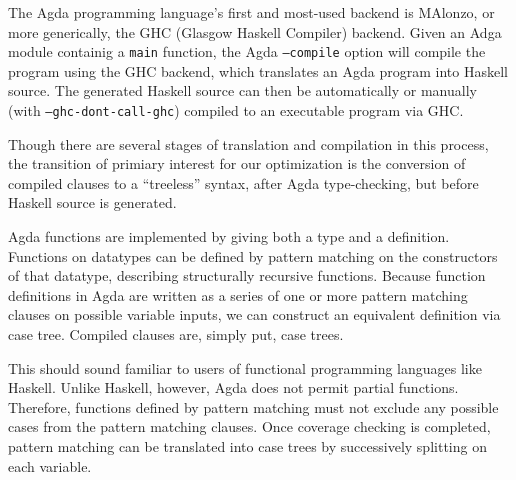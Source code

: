 The Agda programming language's first and most-used backend is MAlonzo, or more generically, the GHC (Glasgow Haskell Compiler) backend.\cite{benke2007} Given an Adga module containig a \lstinline{main} function, the Agda \texttt{--compile} option will compile the program using the GHC backend, which translates an Agda program into Haskell source. The generated Haskell source can then be automatically or manually (with \texttt{--ghc-dont-call-ghc}) compiled to an executable program via GHC.\cite{agdadocs} \newline %

Though there are several stages of translation and compilation in this process, the transition of primiary interest for our optimization is the conversion of compiled clauses to a ``treeless'' syntax, after Agda type-checking, but before Haskell source is generated. \newline

Agda functions are implemented by giving both a type and a definition. Functions on datatypes can be defined by pattern matching on the constructors of that datatype, describing structurally recursive functions.\cite{agdawiki} %
Because function definitions in Agda are written as a series of one or more pattern matching clauses on possible variable inputs, we can construct an equivalent definition via case tree.\cite{agdawiki} %
Compiled clauses are, simply put, case trees. \newline

This should sound familiar to users of functional programming languages like Haskell. Unlike Haskell, however, Agda does not permit partial functions. Therefore, functions defined by pattern matching must not exclude any possible cases from the pattern matching clauses.\cite{agdawiki} %
Once coverage checking is completed, pattern matching can be translated into case trees by successively splitting on each variable.\cite{agdahackage} %

